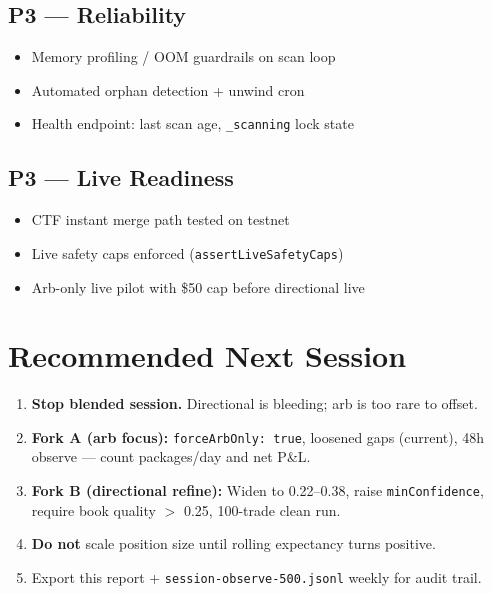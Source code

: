 \documentclass[11pt,a4paper]{article}
\begin{document}
\subsection{P3 --- Reliability}
\begin{itemize}
  \item Memory profiling / OOM guardrails on scan loop
  \item Automated orphan detection + unwind cron
  \item Health endpoint: last scan age, \texttt{\_scanning} lock state
\end{itemize}

\subsection{P3 --- Live Readiness}
\begin{itemize}
  \item CTF instant merge path tested on testnet
  \item Live safety caps enforced (\texttt{assertLiveSafetyCaps})
  \item Arb-only live pilot with \$50 cap before directional live
\end{itemize}

\section{Recommended Next Session}

\begin{enumerate}
  \item \textbf{Stop blended session.} Directional is bleeding; arb is too rare to offset.
  \item \textbf{Fork A (arb focus):} \texttt{forceArbOnly: true}, loosened gaps (current), 48h observe --- count packages/day and net P\&L.
  \item \textbf{Fork B (directional refine):} Widen to 0.22--0.38, raise \texttt{minConfidence}, require book quality $>$ 0.25, 100-trade clean run.
  \item \textbf{Do not} scale position size until rolling expectancy turns positive.
  \item Export this report + \texttt{session-observe-500.jsonl} weekly for audit trail.
\end{enumerate}

\end{document}
